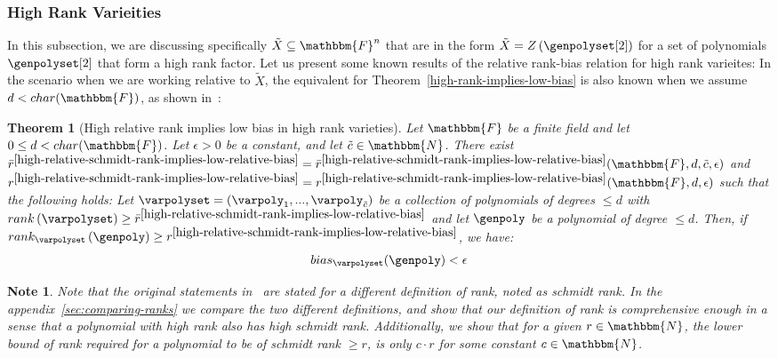 \documentclass[10pt,a4paper]{article}
\newtheorem{theorem}{Theorem}[section]
\newtheorem*{note*}{Note}
\newcommand{\parens}[1]{\left( #1 \right)}
\newcommand{\basefield}[0]{\mathbbm{F}}
\newcommand{\blocklength}[0]{n}
\newcommand{\field}[0]{\basefield^{\blocklength}}
\newcommand{\degree}[0]{d}
\newcommand{\naturalnumbersset}[0]{\mathbbm{N}}
\newcommand{\variety}{{\tilde{X}}}
\newcommand{\varietypolycount}{{\tilde{c}}}
\newcommand{\zerofunc}[1]{Z \parens{#1}}
\newcommand{\rank}[1]{rank \parens{#1}}
\newcommand{\relrank}[2]{rank_{#1} \parens{#2}}
\newcommand{\rankval}[0]{{{r}}}
\newcommand{\varietyrankval}[0]{{\bar{r}}}
\newcommand{\relbias}[2]{bias_{#1}{({#2})}}
\begin{document}
\subsubsection[High Rank Varieities]{High Rank Varieities}
In this subsection, we are discussing specifically $\variety \subseteq \field$ that are in the form $\variety = \zerofunc{\genpolyset[2]}$ for a set of polynomials $\genpolyset[2]$ that form a high rank factor.
Let us present some known results of the relative rank-bias relation for high rank varieites:
In the scenario when we are working relative to $\variety$, the equivalent for Theorem~\ref{high-rank-implies-low-bias} is also known when we assume $\degree < char(\basefield)$, as shown in~\cite[Theorem 1.8]{lampert2021relative}:
\begin{theorem}[High relative rank implies low bias in high rank varieties]\label{high-relative-schmidt-rank-implies-low-relative-bias}
    Let $\basefield$ be a finite field and let $0 \leq \degree < char(\basefield)$.
    Let $\epsilon > 0$ be a constant, and let $\varietypolycount \in \naturalnumbersset$.
    There exist $\varietyrankval^{\ref{high-relative-schmidt-rank-implies-low-relative-bias}} = \varietyrankval^{\ref{high-relative-schmidt-rank-implies-low-relative-bias}}(\basefield, \degree, \varietypolycount, \epsilon)$
    and $\rankval^{\ref{high-relative-schmidt-rank-implies-low-relative-bias}} = \rankval^{\ref{high-relative-schmidt-rank-implies-low-relative-bias}}(\basefield, \degree, \epsilon)$ such that the following holds:
    \newline
    Let $\varpolyset = (\varpoly_1,...,\varpoly_{\varietypolycount})$ be a collection of polynomials of degrees $\leq \degree$ with $\rank{\varpolyset} \geq \varietyrankval^{\ref{high-relative-schmidt-rank-implies-low-relative-bias}}$ and let $\genpoly$ be a polynomial of degree $\leq \degree$.
    \newline
    Then, if $\relrank{\varpolyset}{\genpoly} \geq \rankval^{\ref{high-relative-schmidt-rank-implies-low-relative-bias}}$, we have:
    \[
        \relbias{\varpolyset}{\genpoly} < \epsilon
    \]
\end{theorem}
\begin{note*}
    Note that the original statements in~\cite{lampert2021relative} are stated for a different definition of rank, noted as \emph{schmidt rank}.
    In the appendix~\ref{sec:comparing-ranks} we compare the two different definitions, and show that our definition of rank is comprehensive
    enough in a sense that a polynomial with high rank also has high schmidt rank.
    Additionally, we show that for a given $\rankval \in \naturalnumbersset$, the lower bound of rank required for a polynomial to be of schmidt rank $\geq \rankval$,
    is only $c \cdot \rankval$ for some constant $c \in \naturalnumbersset$.
\end{note*}
\end{document}
